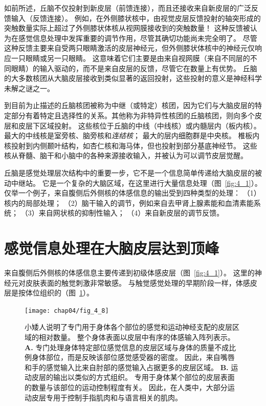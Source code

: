 如前所述，丘脑不仅投射到新皮层（前馈连接），而且还接收来自新皮层的广泛反馈输入（反馈连接）。 
例如，在外侧膝状核中，由视觉皮层反馈投射的轴突形成的突触数量实际上超过了外侧膝状体核从视网膜接收到的突触数量！ 
这种反馈被认为在感觉信息处理中发挥重要的调节作用，尽管其确切功能尚未完全明了。
尽管这种反馈主要来自受两只眼睛激活的皮层神经元，但外侧膝状体核中的神经元仅响应一只眼睛或另一只眼睛。 
这意味着它们主要是由来自视网膜（来自不同层的不同眼睛）的输入驱动的，而不是来自皮层的反馈，尽管它在数量上有优势。 
丘脑的大多数核团从大脑皮层接收到类似显著的返回投射，这些投射的意义是神经科学未解之谜之一。


到目前为止描述的丘脑核团被称为中继（或特定）核团，因为它们与大脑皮层的特定部分有着特定且选择性的关系。其他称为非特异性核团的丘脑核团，则向多个皮层和皮层下区域投射。
这些核位于丘脑的中线（中线核）或内髓层内（板内核）。 
最大的中线核是室旁核、脑旁核和\textit{连结核}；
最大的层内细胞群是中央核。 
椎板内核投射到内侧颞叶结构，如杏仁核和海马体，但也投射到部分基底神经节。
这些核从脊髓、脑干和小脑中的各种来源接收输入，并被认为可以调节皮层觉醒。


丘脑是感觉处理层次结构中的重要一步，它不是一个信息简单传递给大脑皮层的被动中继站。 
它是一个复杂的大脑区域，在这里进行大量信息处理（图~\ref{fig:4_1}）。 
仅举一个例子，来自腹侧后外侧核的体感信息的输出受到四种类型的处理：
（1）核内的局部处理；
（2）脑干输入的调节，例如来自去甲肾上腺素能和血清素能系统； 
（3）来自网状核的抑制性输入； 
（4）来自新皮层的调节反馈。


\section{感觉信息处理在大脑皮层达到顶峰}	

来自腹侧后外侧核的体感信息主要传递到初级体感皮层（图~\ref{fig:4_1}）。 
这里的神经元对皮肤表面的触觉刺激非常敏感。 
与触觉感觉处理的早期阶段一样，体感皮层是按体位组织的（图~\ref{fig:4_8}）。


\begin{figure}[htbp]
	\centering
	\texttt{[image: chap04/fig\_4\_8]}
	\caption{小矮人说明了专门用于身体各个部位的感觉和运动神经支配的皮层区域的相对数量。
		整个身体表面以皮层中有序的体感输入阵列表示。
		\textbf{A.} 专门处理身体特定部位感觉信息的皮层区域与身体的质量不成比例身体部位，而是反映该部位感觉感受器的密度。
		因此，来自嘴唇和手的感觉输入比来自肘部的感觉输入占据更多的皮层区域。
		\textbf{B.} 运动皮层的输出以类似的方式组织。
		专用于身体某个部位的皮层表面的数量与该部位的运动控制程度有关。
		因此，在人类中，大部分运动皮层专用于控制手指肌肉和与语言相关的肌肉。}
	\label{fig:4_8}
\end{figure}


